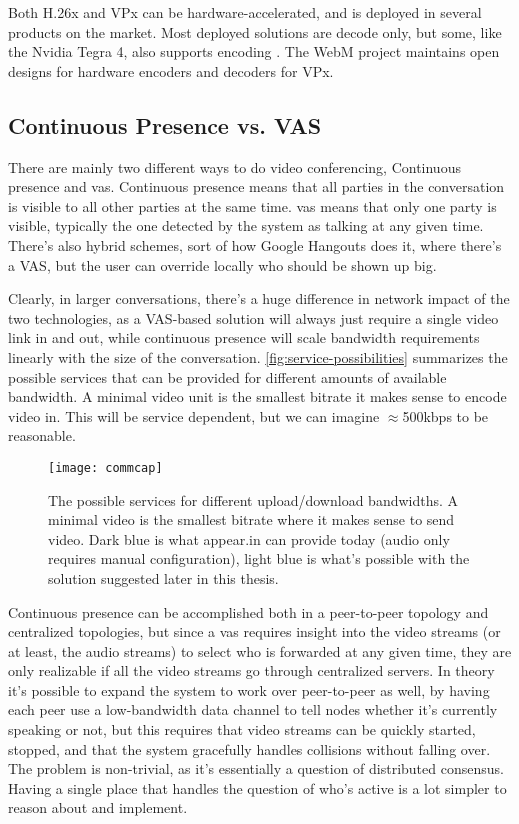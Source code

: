 Both H.26x and VPx can be hardware-accelerated, and is deployed in several products on the market. Most deployed solutions are decode only, but some, like the Nvidia Tegra 4, also supports encoding \cite{nvidia-hw-encode}. The WebM project maintains open designs for hardware encoders and decoders for VPx.


\subsection{Continuous Presence vs. VAS}

There are mainly two different ways to do video conferencing, Continuous presence and \acrfull{vas}. Continuous presence means that all parties in the conversation is visible to all other parties at the same time. \gls{vas} means that only one party is visible, typically the one detected by the system as talking at any given time. There's also hybrid schemes, sort of how Google Hangouts does it, where there's a VAS, but the user can override locally who should be shown up big.

Clearly, in larger conversations, there's a huge difference in network impact of the two technologies, as a VAS-based solution will always just require a single video link in and out, while continuous presence will scale bandwidth requirements linearly with the size of the conversation. \autoref{fig:service-possibilities} summarizes the possible services that can be provided for different amounts of available bandwidth. A minimal video unit is the smallest bitrate it makes sense to encode video in. This will be service dependent, but we can imagine $\approx$500kbps to be reasonable.

\begin{figure}
    \centering
    \texttt{[image: commcap]}
    \caption{The possible services for different upload/download bandwidths. A minimal video is the smallest bitrate where it makes sense to send video. Dark blue is what appear.in can provide today (audio only requires manual configuration), light blue is what's possible with the solution suggested later in this thesis.}
    \label{fig:service-possibilities}
\end{figure}

Continuous presence can be accomplished both in a peer-to-peer topology and centralized topologies, but since a \gls{vas} requires insight into the video streams (or at least, the audio streams) to select who is forwarded at any given time, they are only realizable if all the video streams go through centralized servers. In theory it's possible to expand the system to work over peer-to-peer as well, by having each peer use a low-bandwidth data channel to tell nodes whether it's currently speaking or not, but this requires that video streams can be quickly started, stopped, and that the system gracefully handles collisions without falling over. The problem is non-trivial, as it's essentially a question of distributed consensus. Having a single place that handles the question of who's active is a lot simpler to reason about and implement.

